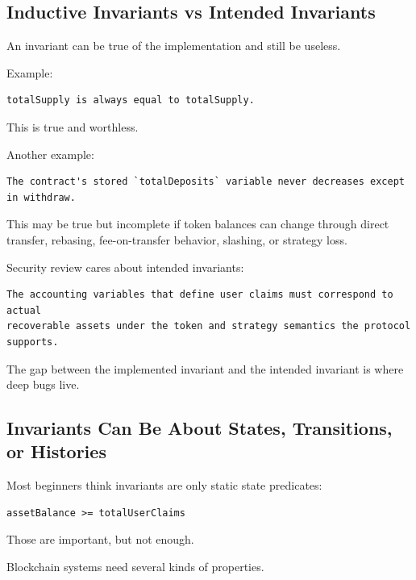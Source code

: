 \subsection{Inductive Invariants vs Intended Invariants}

An invariant can be true of the implementation and still be useless.

Example:

\begin{lstlisting}
totalSupply is always equal to totalSupply.
\end{lstlisting}

This is true and worthless.

Another example:

\begin{lstlisting}
The contract's stored `totalDeposits` variable never decreases except in withdraw.
\end{lstlisting}

This may be true but incomplete if token balances can change through
direct transfer, rebasing, fee-on-transfer behavior, slashing, or
strategy loss.

Security review cares about intended invariants:

\begin{lstlisting}
The accounting variables that define user claims must correspond to actual
recoverable assets under the token and strategy semantics the protocol supports.
\end{lstlisting}

The gap between the implemented invariant and the intended invariant is
where deep bugs live.

\subsection{Invariants Can Be About States, Transitions, or Histories}

Most beginners think invariants are only static state predicates:

\begin{lstlisting}
assetBalance >= totalUserClaims
\end{lstlisting}

Those are important, but not enough.

Blockchain systems need several kinds of properties.

